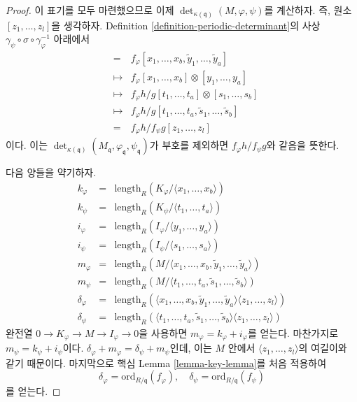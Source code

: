 \begin{proof}
\medskip\noindent
이 표기를 모두 마련했으므로 이제
$\det_{\kappa(\mathfrak q)}(M, \varphi, \psi)$를 계산하자.
즉, 원소 $[z_1, \ldots, z_l]$을 생각하자. Definition
\ref{definition-periodic-determinant}의 사상
$\gamma_\psi \circ \sigma \circ \gamma_\varphi^{-1}$ 아래에서
\begin{eqnarray*}
[z_1, \ldots, z_l] & = &
f_\varphi [x_1, \ldots, x_b, \tilde y_1, \ldots, \tilde y_a] \\
& \mapsto & f_\varphi [x_1, \ldots, x_b] \otimes [y_1, \ldots, y_a] \\
& \mapsto &
f_\varphi h/g [t_1, \ldots, t_a] \otimes [s_1, \ldots, s_b] \\
& \mapsto &
f_\varphi h/g [t_1, \ldots, t_a, \tilde s_1, \ldots, \tilde s_b] \\
& = &
f_\varphi h/f_\psi g [z_1, \ldots, z_l]
\end{eqnarray*}
이다. 이는
$\det_{\kappa(\mathfrak q)}
(M_{\mathfrak q}, \varphi_{\mathfrak q}, \psi_{\mathfrak q})$가
부호를 제외하면 $f_\varphi h/f_\psi g$와 같음을 뜻한다.

\medskip\noindent
다음 양들을 약기하자.
\begin{eqnarray*}
k_\varphi & = & \text{length}_R(K_\varphi/\langle x_1, \ldots, x_b\rangle) \\
k_\psi    & = & \text{length}_R(K_\psi/\langle t_1, \ldots, t_a\rangle) \\
i_\varphi & = & \text{length}_R(I_\varphi/\langle y_1, \ldots, y_a\rangle) \\
i_\psi    & = & \text{length}_R(I_\psi/\langle s_1, \ldots, s_a\rangle) \\
m_\varphi & = & \text{length}_R(M/
\langle x_1, \ldots, x_b, \tilde y_1, \ldots, \tilde y_a\rangle) \\
m_\psi    & = & \text{length}_R(M/
\langle t_1, \ldots, t_a, \tilde s_1, \ldots, \tilde s_b\rangle) \\
\delta_\varphi & = & \text{length}_R(
\langle x_1, \ldots, x_b, \tilde y_1, \ldots, \tilde y_a\rangle
\langle z_1, \ldots, z_l\rangle) \\
\delta_\psi & = & \text{length}_R(
\langle t_1, \ldots, t_a, \tilde s_1, \ldots, \tilde s_b\rangle
\langle z_1, \ldots, z_l\rangle)
\end{eqnarray*}
완전열 $0 \to K_\varphi \to M \to I_\varphi \to 0$을 사용하면
$m_\varphi = k_\varphi + i_\varphi$를 얻는다. 마찬가지로
$m_\psi = k_\psi + i_\psi$이다.
$\delta_\varphi + m_\varphi = \delta_\psi + m_\psi$인데, 이는
$M$ 안에서 $\langle z_1, \ldots, z_l \rangle$의 여길이와 같기
때문이다. 마지막으로 핵심 Lemma \ref{lemma-key-lemma}를 처음
적용하여
$$
\delta_\varphi = \text{ord}_{R/\mathfrak q}(f_\varphi),
\quad
\delta_\psi = \text{ord}_{R/\mathfrak q}(f_\psi)
$$
를 얻는다.


\end{proof}

